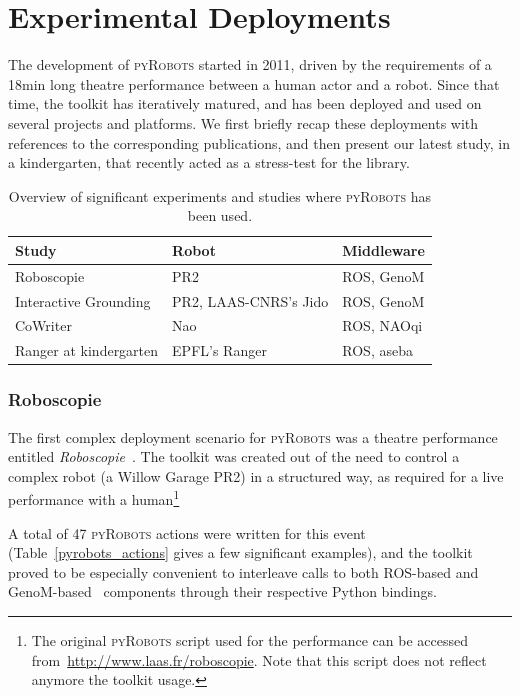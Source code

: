 \documentclass[a4paper, 10pt, conference]{ieeeconf}      %
\newcommand{\pyRobots}{\textsc{pyRobots}}
\begin{document}
\section{Experimental Deployments}

The development of \pyRobots{} started in 2011, driven by the requirements of a
18min long theatre performance between a human actor and a robot. Since that
time, the toolkit has iteratively matured, and has been deployed and used on
several projects and platforms. We first briefly recap these deployments with
references to the corresponding publications, and then present our latest study,
in a kindergarten, that recently acted as a stress-test for the library.

\begin{table}[h]
    \centering
    \begin{tabular}{lll}
        \toprule
        Study                 & Robot & Middleware \\ \midrule
        Roboscopie            & PR2       & ROS, {\sc GenoM} \\
        Interactive Grounding & PR2, LAAS-CNRS's Jido & ROS, {\sc GenoM} \\
        CoWriter              & Nao       & ROS, NAOqi  \\
        Ranger at kindergarten & EPFL's Ranger & ROS, aseba  \\
        \bottomrule
    \end{tabular}
    \caption{Overview of significant experiments and studies where \pyRobots{}
    has been used.}
\end{table}

\subsubsection{Roboscopie} The first complex deployment scenario for \pyRobots{} was
a theatre performance entitled \emph{Roboscopie}~\cite{lemaignan2012roboscopie}.
The toolkit was created out of the need to control a complex robot (a Willow
Garage PR2) in a structured way, as required for a live performance with a
human\footnote{The original \pyRobots{} script used for the performance can be
accessed from~\url{http://www.laas.fr/roboscopie}. Note that this script does
not reflect anymore the toolkit usage.}

A total of 47 \pyRobots{} actions were written for this event
(Table~\ref{pyrobots_actions} gives a few significant examples), and the toolkit
proved to be especially convenient to interleave calls to both ROS-based and
{\sc GenoM}-based~\cite{mallet2010genom3} components through their respective
Python bindings.
\end{document}
